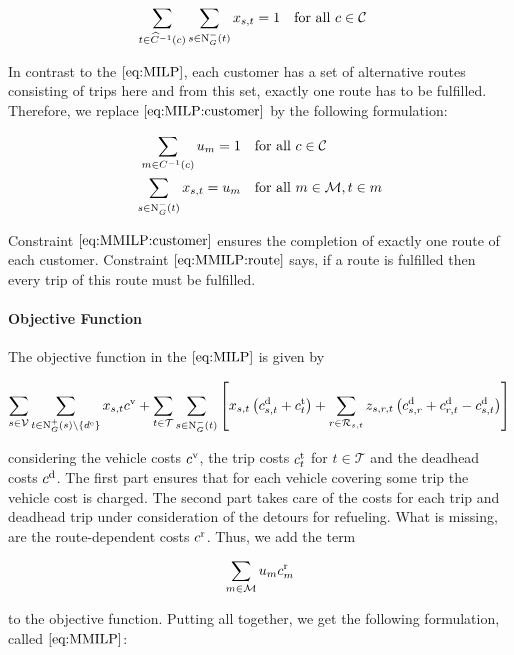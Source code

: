 \begin{align}
	\sum_{t\in \widehat{C}^{-1}(c)} \sum_{s\in\operatorname{N}_G^-(t)} x_{s,t} = 1 &&& \text{for all } c\in\mathcal{C} \label{eq:MILP:customer}
\end{align}

In contrast to the $\eqref{eq:MILP}$, each customer has a set of alternative routes consisting of trips here and from this set, exactly one route has to be fulfilled. Therefore, we replace $\eqref{eq:MILP:customer}$ by the following formulation:

\begin{align}
	\sum_{m\in C^{-1}(c)} u_m = 1 &&& \text{for all } c\in\mathcal{C} \label{eq:MMILP:customer} \\
	\sum_{s\in\operatorname{N}_G^-(t)} x_{s,t} = u_m &&& \text{for all } m\in\mathcal{M}, t\in m \label{eq:MMILP:route}
\end{align}

Constraint $\eqref{eq:MMILP:customer}$ ensures the completion of exactly one route of each customer. Constraint $\eqref{eq:MMILP:route}$ says, if a route is fulfilled then every trip of this route must be fulfilled.

\paragraph{Objective Function} \parfill

The objective function in the $\eqref{eq:MILP}$ is given by

\begin{align*}
	\sum_{s\in\mathcal{V}} \sum_{t\in\operatorname{N}_G^+(s)\backslash\{d^{\operatorname{e}}\}} x_{s,t}c^{\operatorname{v}}	+ \sum_{t\in\mathcal{T}} \sum_{s\in\operatorname{N}_G^-(t)} \left[x_{s,t}\left(c^{\operatorname{d}}_{s,t}+c^{\operatorname{t}}_{t}\right) + \sum_{r\in\mathcal{R}_{s,t}} z_{s,r,t}\left(c^{\operatorname{d}}_{s,r}+c^{\operatorname{d}}_{r,t}-c^{\operatorname{d}}_{s,t}\right)\right]
\end{align*}

considering the vehicle costs $c^{\operatorname{v}}$, the trip costs $c^{\operatorname{t}}_t$ for $t\in\mathcal{T}$ and the deadhead costs $c^{\operatorname{d}}$. The first part ensures that for each vehicle covering some trip the vehicle cost is charged. The second part takes care of the costs for each trip and deadhead trip under consideration of the detours for refueling. What is missing, are the route-dependent costs $c^{\operatorname{r}}$. Thus, we add the term

\begin{align*}
	\sum_{m\in\mathcal{M}} u_m c^{\operatorname{r}}_m
\end{align*}

to the objective function. Putting all together, we get the following formulation, called $\eqref{eq:MMILP}$:

